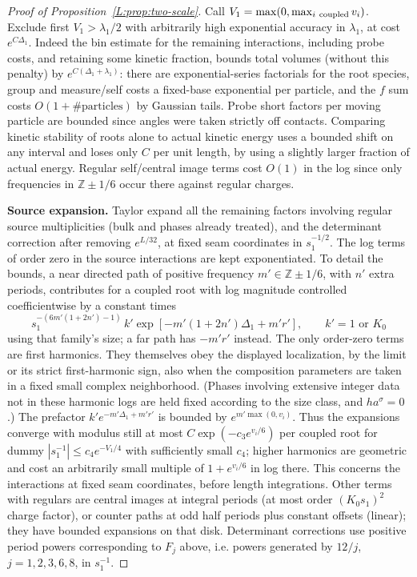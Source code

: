\begin{proof}[Proof of Proposition~\ref{L:prop:two-scale}]
Call \(V_1=\max(0,\max_{i\ {\rm coupled}}v_i)\). Exclude first \(V_1>\lambda_1/2\) with arbitrarily high exponential accuracy in \(\lambda_1\), at cost \(e^{C\Delta_1}\). Indeed the bin estimate for the remaining interactions, including probe costs, and retaining some kinetic fraction, bounds total volumes (without this penalty) by \(e^{C(\Delta_1+\lambda_1)}\): there are exponential-series factorials for the root species, group and measure/self costs a fixed-base exponential per particle, and the \(f\) sum costs \(O(1+\#\text{particles})\) by Gaussian tails. Probe short factors per moving particle are bounded since angles were taken strictly off contacts. Comparing kinetic stability of roots alone to actual kinetic energy uses a bounded shift on any interval and loses only \(C\) per unit length, by using a slightly larger fraction of actual energy. Regular self/central image terms cost \(O(1)\) in the log since only frequencies in \(\mathbb Z\pm1/6\) occur there against regular charges.

\par\medskip\noindent\textbf{Source expansion.}
Taylor expand all the remaining factors involving regular source multiplicities (bulk and phases already treated), and the determinant correction after removing \(e^{L/32}\), at fixed seam coordinates in \(s_1^{-1/2}\). The log terms of order zero in the source interactions are kept exponentiated. To detail the bounds, a near directed path of positive frequency \(m'\in\mathbb Z\pm1/6\), with \(n'\) extra periods, contributes for a coupled root with log magnitude controlled coefficientwise by a constant times
\[
 s_1^{-(6m'(1+2n')-1)}
 \, k' \exp[-m'(1+2n')\Delta_1+m'r'],\qquad k'=1\text{ or }K_0
\]
using that family's size; a far path has \(-m'r'\) instead. The only order-zero terms are first harmonics. They themselves obey the displayed localization, by the limit or its strict first-harmonic sign, also when the composition parameters are taken in a fixed small complex neighborhood. (Phases involving extensive integer data not in these harmonic logs are held fixed according to the size class, and \(h a^\sigma=0\).) The prefactor \(k'e^{-m'\Delta_1+m'r'}\) is bounded by \(e^{m'\max(0,v_i)}\). Thus the expansions converge with modulus still at most \(C\exp(-c_3 e^{v_i/6})\) per coupled root for dummy \(|s_1^{-1}|\le c_4 e^{-V_1/4}\) with sufficiently small \(c_4\); higher harmonics are geometric and cost an arbitrarily small multiple of \(1+e^{v_i/6}\) in log there. This concerns the interactions at fixed seam coordinates, before length integrations. Other terms with regulars are central images at integral periods (at most order \((K_0s_1)^2\) charge factor), or counter paths at odd half periods plus constant offsets (linear); they have bounded expansions on that disk. Determinant corrections use positive period powers corresponding to \(F_j\) above, i.e. powers generated by \(12/j\), \(j=1,2,3,6,8\), in \(s_1^{-1}\).


\end{proof}

